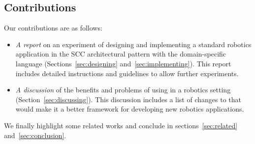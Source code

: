 \subsection*{Contributions}

Our contributions are as follows:

\begin{itemize}
\item \emph{A report} on an experiment of designing and implementing a
  standard robotics application in the SCC architectural pattern with
  the \diaspec{} domain-specific language
  (Sections~\ref{sec:designing} and~\ref{sec:implementing}). This
  report includes detailed instructions and guidelines to allow
  further experiments.
\item \emph{A discussion} of the benefits and problems of using
  \diaspec{} in a robotics setting (Section~\ref{sec:discussing}).
  This discussion includes a list of changes to \diaspec{} that would
  make it a better framework for developing new robotics applications.
\end{itemize}

We finally highlight some related works and conclude in
sections~\ref{sec:related} and~\ref{sec:conclusion}.


